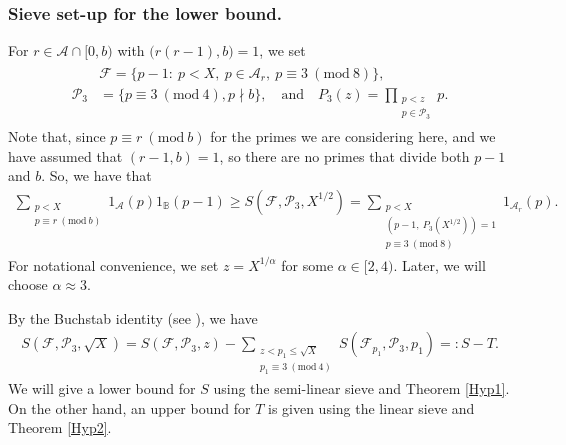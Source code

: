 \documentclass[12pt]{amsart}
\numberwithin{equation}{section}
\theoremstyle{remark}
\theoremstyle{definition}
\newcommand{\imod}[1]{\ (\mathrm{mod}\ #1)}
\begin{document}
\subsubsection{Sieve set-up for the lower bound.} For $r\in \mathcal{A}\cap[0,b)$ with $\big(r(r-1), b\big)=1$, we set
 \begin{align}\label{setup F}
\begin{split}
&\mathcal{F} ={\{p-1:\: p < X, \: p\in \mathcal{A}_r,\: p\equiv 3\imod 8\}},\\
\mathcal{P}_3 & =\{p\equiv 3\imod 4, p\nmid b\},\quad \text{and} \quad  P_3(z)=\prod_{\substack{p<z\\p\in \mathcal{P}_3}}p.
\end{split}
\end{align}
Note that, since $p\equiv r\imod b$ for the primes we are considering here, and we have assumed that $(r-1,b)=1$, so there are no primes that divide both $p-1$ and $b$. So, we have that 
\begin{align}
\label{sieve lower} \sum_{\substack{p<X\\p\equiv r\imod b}}1_{\mathcal{A}}(p)1_{\mathbb{B}}(p-1)\geq S(\mathcal{F}, \mathcal{P}_3, X^{1/2})=\sum_{\substack{p<X\\(p-1,\: P_3(X^{1/2}))=1\\p\equiv 3\imod 8}}1_{\mathcal{A}_r}(p).
\end{align}
For notational convenience, we set $z=X^{1/\alpha}$ for some $\alpha\in [2, 4)$. Later, we will choose $\alpha\approx3$.

By the Buchstab identity (see \cite[eqn (6.4)]{opera}), we have
\begin{align}
\label{Buch} S(\mathcal{F}, \mathcal{P}_3, \sqrt{X}) = S(\mathcal{F}, \mathcal{P}_3, z)-\sum_{\substack{z<p_1\leq \sqrt{X}\\p_1\equiv 3\imod 4}}S(\mathcal{F}_{p_1}, \mathcal{P}_3, p_1)=:S-T.
\end{align}
We will give a lower bound for $S$ using the semi-linear sieve and Theorem \ref{Hyp1}. On the other hand, an upper bound for $T$ is given using the linear sieve and Theorem \ref{Hyp2}. 
\end{document}
